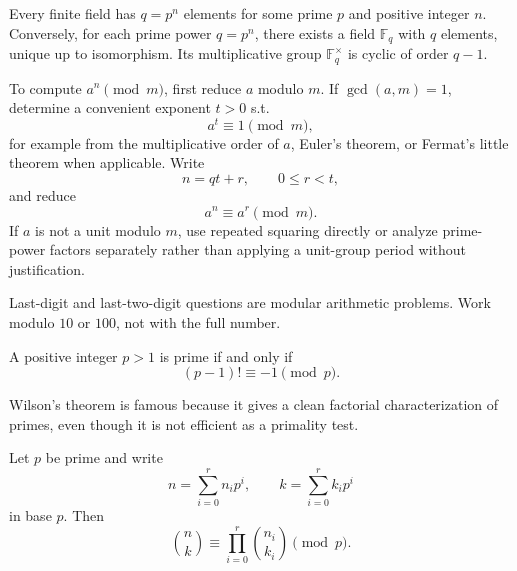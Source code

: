     \begin{theorem}
        Every finite field has $q=p^n$ elements for some prime $p$ and positive
        integer $n$. Conversely, for each prime power $q=p^n$, there exists a
        field $\mathbb{F}_q$ with $q$ elements, unique up to isomorphism. Its
        multiplicative group $\mathbb{F}_q^\times$ is cyclic of order $q-1$.
    \end{theorem}

    \begin{algorithm}
        To compute $a^n\pmod m$, first reduce $a$ modulo $m$. If
        $\gcd(a,m)=1$, determine a convenient exponent $t>0$ s.t.
        \[
            a^t\equiv1\pmod m,
        \]
        for example from the multiplicative order of $a$, Euler's theorem, or
        Fermat's little theorem when applicable. Write
        \[
            n=qt+r,
            \qquad
            0\leq r<t,
        \]
        and reduce
        \[
            a^n\equiv a^r\pmod m.
        \]
        If $a$ is not a unit modulo $m$, use repeated squaring directly or
        analyze prime-power factors separately rather than applying a unit-group
        period without justification.
    \end{algorithm}

    \begin{strategy}
        Last-digit and last-two-digit questions are modular arithmetic problems.
        Work modulo $10$ or $100$, not with the full number.
    \end{strategy}

    \begin{theorem}
        A positive integer $p>1$ is prime if and only if
        \[
            (p-1)!\equiv -1\pmod p.
        \]
    \end{theorem}

    \begin{remark}
        Wilson's theorem is famous because it gives a clean factorial
        characterization of primes, even though it is not efficient as a
        primality test.
    \end{remark}

    \begin{theorem}
        Let $p$ be prime and write
        \[
            n=\sum_{i=0}^{r}n_ip^i,
            \qquad
            k=\sum_{i=0}^{r}k_ip^i
        \]
        in base $p$. Then
        \[
            \binom{n}{k}
            \equiv
            \prod_{i=0}^{r}\binom{n_i}{k_i}
            \pmod p.
        \]
    \end{theorem}

